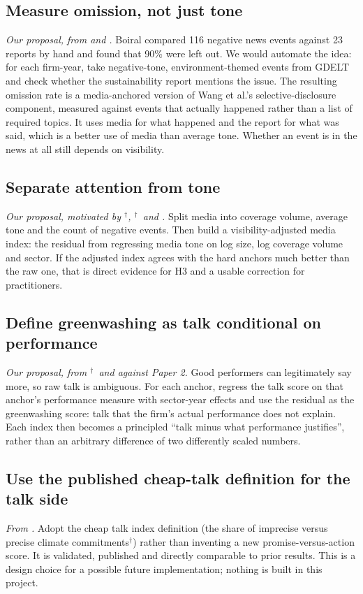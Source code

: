 \documentclass[12pt,a4paper]{article}
\newcommand{\dg}{$^{\dagger}$}          %
\begin{document}
\subsection{Measure omission, not just tone}
\emph{Our proposal, from \citet{boiral2013} and \citet{wang2025}.} Boiral compared 116 negative news
events against 23 reports by hand and found that 90\% were left out. We would automate the idea:
for each firm-year, take negative-tone, environment-themed events from GDELT and check whether the
sustainability report mentions the issue. The resulting omission rate is a media-anchored version
of Wang et al.'s selective-disclosure component, measured against events that actually happened
rather than a list of required topics. It uses media for what happened and the report for what was
said, which is a better use of media than average tone. Whether an event is in the news at all still
depends on visibility.

\subsection{Separate attention from tone}
\emph{Our proposal, motivated by \citet{drempetic2020}\dg, \citet{gibsonbrandon2021}\dg\ and
\citet{raghunandan2022}.} Split media into coverage volume, average tone and the count of negative
events. Then build a visibility-adjusted media index: the residual from regressing media tone on log
size, log coverage volume and sector. If the adjusted index agrees with the hard anchors much better
than the raw one, that is direct evidence for H3 and a usable correction for practitioners.

\subsection{Define greenwashing as talk conditional on performance}
\emph{Our proposal, from \citet{clarkson2008}\dg\ and \citet{tadros2019} against Paper 2.} Good
performers can legitimately say more, so raw talk is ambiguous. For each anchor, regress the talk
score on that anchor's performance measure with sector-year effects and use the residual as the
greenwashing score: talk that the firm's actual performance does not explain. Each index then
becomes a principled ``talk minus what performance justifies'', rather than an arbitrary difference
of two differently scaled numbers.

\subsection{Use the published cheap-talk definition for the talk side}
\emph{From \citet{bingler2022,bingler2024}.} Adopt the cheap talk index definition (the share of
imprecise versus precise climate commitments\dg) rather than inventing a new promise-versus-action
score. It is validated, published and directly comparable to prior results. This is a design choice
for a possible future implementation; nothing is built in this project.
\end{document}
